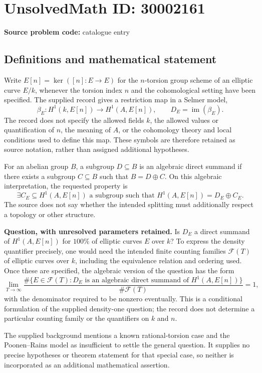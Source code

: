 \documentclass[11pt]{article}
\begin{document}
\section*{UnsolvedMath ID: 30002161}
\textbf{Source problem code:} catalogue entry
\subsection{Definitions and mathematical statement}
Write \(E[n]=\ker([n]\colon E\to E)\) for the \(n\)-torsion group scheme of an elliptic curve \(E/k\), whenever the torsion index \(n\) and the cohomological setting have been specified. The supplied record gives a restriction map in a Selmer model,
\[
\beta_E\colon H^1(k,E[n])\longrightarrow H^1(A,E[n]),
\qquad D_E=\operatorname{im}(\beta_E).
\]
The record does not specify the allowed fields \(k\), the allowed values or quantification of \(n\), the meaning of \(A\), or the cohomology theory and local conditions used to define this map. These symbols are therefore retained as source notation, rather than assigned additional hypotheses.

For an abelian group \(B\), a subgroup \(D\subseteq B\) is an algebraic direct summand if there exists a subgroup \(C\subseteq B\) such that \(B=D\oplus C\). On this algebraic interpretation, the requested property is
\[
\exists C_E\subseteq H^1(A,E[n])\text{ a subgroup such that }
H^1(A,E[n])=D_E\oplus C_E.
\]
The source does not say whether the intended splitting must additionally respect a topology or other structure.

\textbf{Question, with unresolved parameters retained.} Is \(D_E\) a direct summand of \(H^1(A,E[n])\) for \(100\%\) of elliptic curves \(E\) over \(k\)? To express the density quantifier precisely, one would need the intended finite counting families \(\mathcal F(T)\) of elliptic curves over \(k\), including the equivalence relation and ordering used. Once these are specified, the algebraic version of the question has the form
\[
\lim_{T\to\infty}
\frac{\#\{E\in\mathcal F(T):D_E\text{ is an algebraic direct summand of }H^1(A,E[n])\}}
{\#\mathcal F(T)}=1,
\]
with the denominator required to be nonzero eventually. This is a conditional formulation of the supplied density-one question; the record does not determine a particular counting family or the quantifiers on \(k\) and \(n\).

The supplied background mentions a known rational-torsion case and the Poonen--Rains model as insufficient to settle the general question. It supplies no precise hypotheses or theorem statement for that special case, so neither is incorporated as an additional mathematical assertion.
\end{document}
